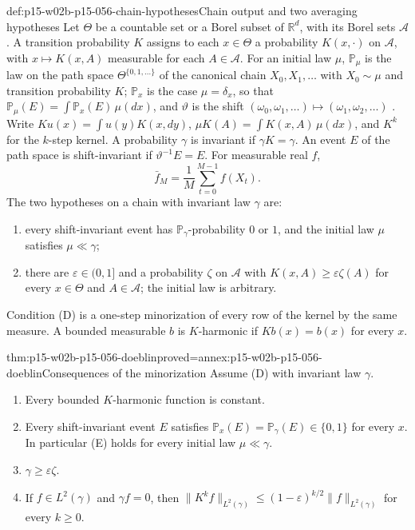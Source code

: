 \begin{hbdefinition}{def:p15-w02b-p15-056-chain-hypotheses}{Chain output and two averaging hypotheses}
Let \(\Theta\) be a countable set or a Borel subset of \(\mathbb R^d\),
with its Borel sets \(\mathcal A\). A transition probability \(K\) assigns
to each \(x\in\Theta\) a probability \(K(x,\cdot)\) on \(\mathcal A\),
with \(x\mapsto K(x,A)\) measurable for each \(A\in\mathcal A\). For an
initial law \(\mu\), \(\mathbb P_\mu\) is the law on the path space
\(\Theta^{\{0,1,\ldots\}}\) of the canonical chain
\(X_0,X_1,\ldots\) with \(X_0\sim\mu\) and transition probability \(K\);
\(\mathbb P_x\) is the case \(\mu=\delta_x\), so that
\(\mathbb P_\mu(E)=\int\mathbb P_x(E)\,\mu(dx)\), and \(\vartheta\) is the
shift \((\omega_0,\omega_1,\ldots)\mapsto(\omega_1,\omega_2,\ldots)\)
\cite[Sec.~5.2, p.~273]{DurrettPTEAuthor2019}. Write
\(Ku(x)=\int u(y)K(x,dy)\), \(\mu K(A)=\int K(x,A)\,\mu(dx)\), and
\(K^k\) for the \(k\)-step kernel. A probability \(\gamma\) is invariant
if \(\gamma K=\gamma\). An event \(E\) of the path space is
shift-invariant if \(\vartheta^{-1}E=E\). For measurable real \(f\),
\[
 \bar f_M=\frac1M\sum_{t=0}^{M-1}f(X_t).
\]
The two hypotheses on a chain with invariant law \(\gamma\) are:
\begin{enumerate}
\item[(E)] every shift-invariant event has \(\mathbb P_\gamma\)-probability
\(0\) or \(1\), and the initial law \(\mu\) satisfies \(\mu\ll\gamma\);
\item[(D)] there are \(\varepsilon\in(0,1]\) and a probability \(\zeta\)
on \(\mathcal A\) with \(K(x,A)\geq\varepsilon\zeta(A)\) for every
\(x\in\Theta\) and \(A\in\mathcal A\); the initial law is arbitrary.
\end{enumerate}
Condition (D) is a one-step minorization of every row of the kernel by
the same measure. A bounded measurable \(b\) is \(K\)-harmonic if
\(Kb(x)=b(x)\) for every \(x\).
\end{hbdefinition}

\begin{hblemma}{thm:p15-w02b-p15-056-doeblin}{proved=annex:p15-w02b-p15-056-doeblin}{Consequences of the minorization}
Assume (D) with invariant law \(\gamma\).
\begin{enumerate}
\item Every bounded \(K\)-harmonic function is constant.
\item Every shift-invariant event \(E\) satisfies
\(\mathbb P_x(E)=\mathbb P_\gamma(E)\in\{0,1\}\) for every \(x\). In
particular (E) holds for every initial law \(\mu\ll\gamma\).
\item \(\gamma\geq\varepsilon\zeta\).
\item If \(f\in L^2(\gamma)\) and \(\gamma f=0\), then
\(\|K^kf\|_{L^2(\gamma)}\leq(1-\varepsilon)^{k/2}\|f\|_{L^2(\gamma)}\)
for every \(k\geq0\).
\end{enumerate}
\end{hblemma}

